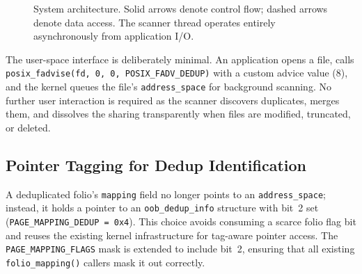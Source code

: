 \documentclass[conference]{IEEEtran}
\begin{document}
\begin{figure}[t]
\centering
{}
\caption{System architecture. Solid arrows denote control flow; dashed arrows denote data access. The scanner thread operates entirely asynchronously from application I/O.}
\label{fig:arch}
\end{figure}

The user-space interface is deliberately minimal. An application opens a file, calls \texttt{posix\_fadvise(fd, 0, 0, POSIX\_FADV\_DEDUP)} with a custom advice value (8), and the kernel queues the file's \texttt{address\_space} for background scanning. No further user interaction is required as the scanner discovers duplicates, merges them, and dissolves the sharing transparently when files are modified, truncated, or deleted.

\subsection{Pointer Tagging for Dedup Identification}

A deduplicated folio's \texttt{mapping} field no longer points to an \texttt{address\_space}; instead, it holds a pointer to an \texttt{oob\_dedup\_info} structure with bit~2 set (\texttt{PAGE\_MAPPING\_DEDUP = 0x4}). This choice avoids consuming a scarce folio flag bit and reuses the existing kernel infrastructure for tag-aware pointer access. The \texttt{PAGE\_MAPPING\_FLAGS} mask is extended to include bit~2, ensuring that all existing \texttt{folio\_mapping()} callers mask it out correctly.
\end{document}
